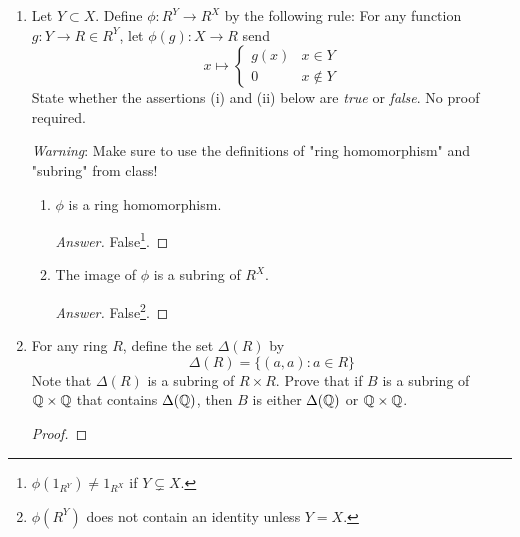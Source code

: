\documentclass[../psets.tex]{subfiles}
\begin{document}
\begin{enumerate}[resume]
\begin{proof}
\begin{equation*}
            [f^*(1_{R^Y})](x) = (1_{R^Y}\circ f)(x)
            = 1_{R^Y}(f(x))
            = 1_R
        \end{equation*}
        where the last equality holds by the definition of $1_{R^Y}$ since $f(x)\in Y$. Thus, since $f^*(1_{R^Y}):X\to R$ sends every $x\in X$ to $1_R$, it must be equal to $1_{R^X}$ by the definition of the latter, as desired.
    \end{proof}
    \item Let $Y\subset X$. Define $\phi:R^Y\to R^X$ by the following rule: For any function $g:Y\to R\in R^Y$, let $\phi(g):X\to R$ send
    \begin{equation*}
        x \mapsto
        \begin{cases}
            g(x) & x\in Y\\
            0 & x\notin Y
        \end{cases}
    \end{equation*}
    State whether the assertions (i) and (ii) below are \emph{true} or \emph{false}. No proof required.\par
    \emph{Warning}: Make sure to use the definitions of "ring homomorphism" and "subring" from class!
    \begin{enumerate}
        \item $\phi$ is a ring homomorphism.
        \begin{proof}[Answer]
            False\footnote{$\phi(1_{R^Y})\neq 1_{R^X}$ if $Y\subsetneq X$.}.
        \end{proof}
        \item The image of $\phi$ is a subring of $R^X$.
        \begin{proof}[Answer]
            False\footnote{$\phi(R^Y)$ does not contain an identity unless $Y=X$.}.
        \end{proof}
    \end{enumerate}
    \item For any ring $R$, define the set $\Delta(R)$ by
    \begin{equation*}
        \Delta(R) = \{(a,a):a\in R\}
    \end{equation*}
    Note that $\Delta(R)$ is a subring of $R\times R$. Prove that if $B$ is a subring of $\mathbb{Q}\times\mathbb{Q}$ that contains $\Delta(\mathbb{Q})$, then $B$ is either $\Delta(\mathbb{Q})$ or $\mathbb{Q}\times\mathbb{Q}$.
    \begin{proof}




\end{proof}
\end{enumerate}
\end{document}

